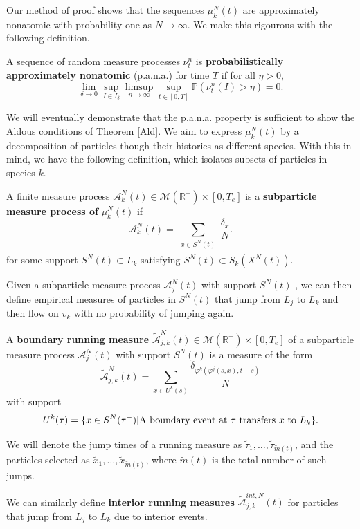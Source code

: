 Our method of proof shows  that the sequences $\mu_k^N(t)$ are approximately nonatomic with probability one as $N\rightarrow \infty$. We make this rigourous with the following definition.
\begin{deef}
 A sequence of random measure processes $\nu_t^n$ is \textbf{probabilistically approximately nonatomic} (p.a.n.a.) for time $T$ if for all $\eta > 0$,  \begin{equation}\label{paac}
 \lim_{\delta \rightarrow 0}\sup_{I \in I_\delta}\limsup_{n\rightarrow \infty} \sup_{t \in [0,T]}\mathbb P(\nu_t^n(I) >\eta) = 0 .
\end{equation}
\end{deef}
We will eventually demonstrate that the p.a.n.a. property is sufficient to show the Aldous conditions of Theorem \ref{Ald}. We aim to  express $\mu_k^N(t)$ by a decomposition of particles though their histories as different species. With this in mind, we have the following definition, which isolates subsets of particles in species $k$.

\begin{deef} A finite measure process $\mathscr A_k^N(t) \in \mathcal M(\mathbb{R}^+)\times [0,T_e]$   is a  \textbf{subparticle measure process of}  $\mu_k^N(t)$ if \begin{equation}
\mathscr A_{k}^N(t)= \sum_{\substack{x \in S^N(t) \\ }} \frac{\delta_{x}}{N}.
\end{equation}
for some support $S^{N}(t) \subset L_k$ satisfying $S^{N}(t) \subset S_k(X^{N}(t))$. \end{deef}



Given a subparticle measure process $\mathscr A_{j}^N(t)$ with support $S^{N}(t)$ , we can then define empirical measures of particles in $S^N(t)$ that jump from $L_j$ to $L_k$ and then flow on $v_k$ with no probability of jumping again. 


\begin{deef}
A \textbf{boundary running measure} $ \tilde{\mathscr A}_{j,k}^N(t) \in \mathcal M(\mathbb{R}^+)\times [0,T_e]$ of a subparticle measure process $\mathscr A_{j}^N(t)$ with support $S^{N}(t)$ is a measure of the form
\begin{equation}
\tilde{\mathscr A}_{j,k}^N(t) = \sum_{x\in U^k(s)}  \frac{\delta_{\varphi^k(\varphi^j(s, x), t-s)}}{N}
\end{equation}  
 with support
\begin{equation}
U^k(\tau) = \{x\in S^N(\tau^-) | \hbox{A boundary event at $\tau$ transfers $x$ to $L_k$}\}.
\end{equation}


We will denote the jump times of a running measure as $\tilde \tau_1,\dots, \tilde \tau_{\tilde m(t)}$, and the particles selected as $\tilde x_1, \dots, \tilde x_{\tilde m(t)}$, where $\tilde m(t)$ is the total number of such jumps.
\end{deef}
We can similarly define \textbf{interior running measures} $\tilde{\mathscr A}_{j,k}^{int,N}(t)$ for particles that jump from $L_j$ to $L_k$ due to interior events.  

